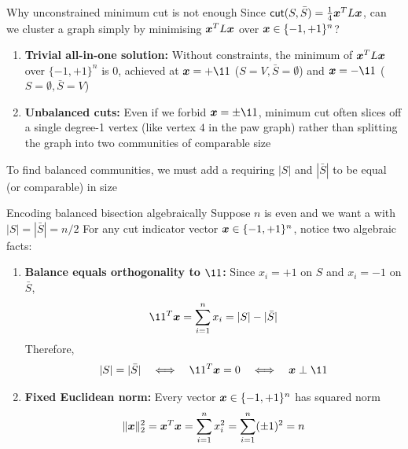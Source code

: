 \documentclass[aspectratio=169]{beamer}\usepackage[]{graphicx}\usepackage[]{xcolor}
\begin{document}

\begin{frame}{Why unconstrained minimum cut is not enough}
Since $\mathsf{cut}(S, \bar{S}) = \frac{1}{4}\bm{x}^T L \bm{x}$, can we cluster a graph simply by minimising $\bm{x}^T L \bm{x}$ over $\bm{x} \in \{-1, +1\}^n$?
\vfill
\begin{enumerate}
\item \textbf{Trivial all-in-one solution:} Without constraints, the minimum of $\bm{x}^T L \bm{x}$ over $\{-1, +1\}^n$ is $0$, achieved at $\bx = +\11$ ($S = V, \bar{S} = \emptyset$) and $\bx = -\11$ ($S = \emptyset, \bar{S} = V$)
\vfill
\item \textbf{Unbalanced cuts:} Even if we forbid $\bx = \pm\11$, minimum cut often slices off a single degree-1 vertex (like vertex $4$ in the paw graph) rather than splitting the graph into two communities of comparable size
\end{enumerate}
\vfill
To find balanced communities, we must add a  requiring $|S|$ and $|\bar{S}|$ to be equal (or comparable) in size
\end{frame}


\begin{frame}{Encoding balanced bisection algebraically}
Suppose $n$ is even and we want a  with $|S| = |\bar{S}| = n/2$
\vfill
For any cut indicator vector $\bm{x} \in \{-1, +1\}^n$, notice two algebraic facts:
\vfill
\begin{enumerate}
\item \textbf{Balance equals orthogonality to $\11$:} Since $x_i = +1$ on $S$ and $x_i = -1$ on $\bar{S}$,
\[
\11^T \bx = \sum_{i=1}^n x_i = |S| - |\bar{S}|
\]
Therefore,
\[
|S| = |\bar{S}| \quad \Longleftrightarrow \quad \11^T \bx = 0 \quad \Longleftrightarrow \quad \bx \perp \11
\]
\item \textbf{Fixed Euclidean norm:} Every vector $\bm{x} \in \{-1, +1\}^n$ has squared norm
\[
\|\bm{x}\|_2^2 = \bm{x}^T \bm{x} = \sum_{i=1}^n x_i^2 = \sum_{i=1}^n (\pm 1)^2 = n
\]
\end{enumerate}
\end{frame}
\end{document}
